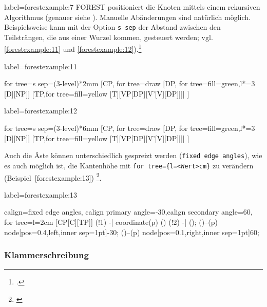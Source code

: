 \begin{lfgwcode}{label={forestexample:7}}
FOREST positioniert die Knoten mittels einem rekursiven Algorithmus (genauer siehe 
\cite[Kap.\,2.4]{zivanovic:forest}). Manuelle Abänderungen sind natürlich möglich. Beispielsweise
kann mit der Option 
\texttt{s sep} der Abstand zwischen den Teilsträngen, die aus einer Wurzel kommen, 
gesteuert werden; vgl. \ref{forestexample:11} und
\ref{forestexample:12}).\footnote{\cite[Beispiel\,27]{zivanovic:forest}.}


\begin{lfgwexample}{label={forestexample:11}}
\begin{forest}
for tree={s sep=(3-level)*2mm}
[CP, for tree=draw
[DP, for tree={fill=green},l*=3
[D][NP]]
[TP,for tree={fill=yellow}
[T][VP[DP][V’[V][DP]]]]
]
\end{forest}
\end{lfgwexample}

\begin{lfgwexample}{label={forestexample:12}}
\begin{forest}
for tree={s sep=(3-level)*6mm}
[CP, for tree=draw
[DP, for tree={fill=green},l*=3
[D][NP]]
[TP,for tree={fill=yellow}
[T][VP[DP][V’[V][DP]]]]
]
\end{forest}
\end{lfgwexample}

Auch die Äste können unterschiedlich gespreizt werden (\texttt{fixed edge angles}),
wie es auch möglich ist, die Kantenhöhe mit \verb|for tree={l=<Wert>cm}| zu verändern 
(Beispiel~\ref{forestexample:13})
\footnote{\cite[Beispiel~59]{zivanovic:forest}}.

\begin{lfgwexample}{label={forestexample:13}}
\begin{forest}
calign=fixed edge angles,
calign primary angle=-30,calign secondary angle=60,
for tree={l=2cm}
[CP[C][TP]]
\draw[dotted] (!1) -| coordinate(p) () (!2) -| ();
\path ()--(p) node[pos=0.4,left,inner sep=1pt]{-30};
\path ()--(p) node[pos=0.1,right,inner sep=1pt]{60};
\end{forest}
\end{lfgwexample}

\subsubsection{Klammerschreibung}


\end{lfgwcode}
